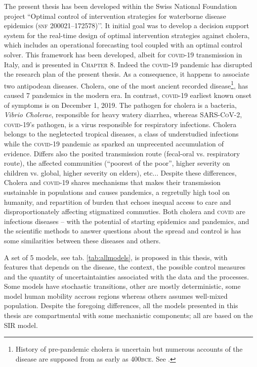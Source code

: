 The present thesis has been developed within the Swiss National Foundation project ``Optimal control of intervention strategies for waterborne disease epidemics (\textsc{snf} 200021–172578)’’. It initial goal was to develop a decision support system for the real-time design of optimal intervention strategies against cholera, which includes an operational forecasting tool coupled with an optimal control solver. This framework has been developed, albeit for \textsc{covid}-19 transmission in Italy, and is presented in \textsc{Chapter 8}. Indeed the \textsc{covid}-19 pandemic has disrupted the research plan of the present thesis. As a consequence, it happens to associate two antipodean diseases. Cholera, one of the most ancient recorded disease\footnote[][10\baselineskip]{History of pre-pandemic cholera is uncertain but numerous accounts of the disease are supposed from as early as 400\textsc{bce}. See .}, has caused 7 pandemics in the modern era. In contrast, \textsc{covid}-19 earliest known onset of symptoms is on December 1, 2019. The pathogen for cholera is a bacteria, \textit{Vibrio Cholerae}, responsible for heavy watery diarrhea, whereas \textsc{SARS-CoV-2}, \textsc{covid}-19’s pathogen, is a virus responsible for respiratory infections. Cholera belongs to the negletected tropical diseases, a class of understudied infections while the \textsc{covid}-19 pandemic as sparked an unprecented accumulation of evidence. Differs also the posited transmission route (fecal-oral vs. respiratory route), the affected communities (``poorest of the poor”, higher severity on children vs. global, higher severity on elders), etc... Despite these differences, Cholera and \textsc{covid}-19 shares mechanisms that makes their transmission sustainable in populations and causes pandemics, a regretully high tool on humanity, and repartition of burden that echoes inequal access to care and disproportionately affecting stigmatized commuties. Both cholera and \textsc{covid} are infectious diseases -- with the potential of starting epidemics and pandemics, and the scientific methods to answer questions about the spread and control is has some similarities between these diseases and others.


A set of 5 models, see tab. \ref{tab:allmodels}, is proposed in this thesis, with features that depends on the disease, the context, the possible control measures and the quantity of uncertaintainties associated with the data and the processes. Some models have stochastic transitions, other are mostly deterministic, some model human mobility accross regions whereas others assumes well-mixed population. Despite the foregoing differences, all the models presented in this thesis are compartmental with some mechanistic components; all are based on the SIR model.

